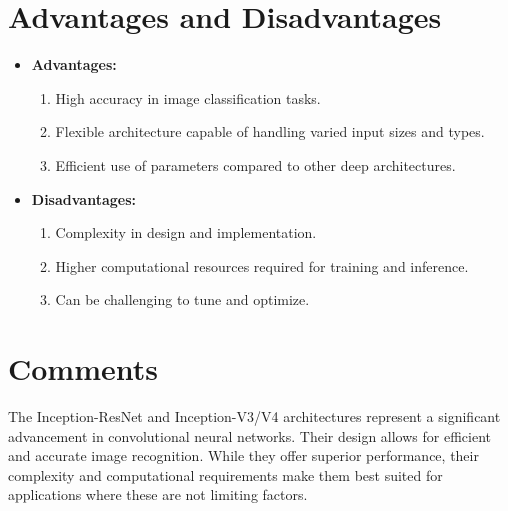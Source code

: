 \section{Advantages and Disadvantages}
\begin{itemize}
    \item \textbf{Advantages:}
    \begin{enumerate}
        \item High accuracy in image classification tasks.
        \item Flexible architecture capable of handling varied input sizes and types.
        \item Efficient use of parameters compared to other deep architectures.
    \end{enumerate}
    \item \textbf{Disadvantages:}
    \begin{enumerate}
        \item Complexity in design and implementation.
        \item Higher computational resources required for training and inference.
        \item Can be challenging to tune and optimize.
    \end{enumerate}
\end{itemize}

\section{Comments}
The Inception-ResNet and Inception-V3/V4 architectures represent a significant advancement in convolutional neural networks. Their design allows for efficient and accurate image recognition. While they offer superior performance, their complexity and computational requirements make them best suited for applications where these are not limiting factors.
